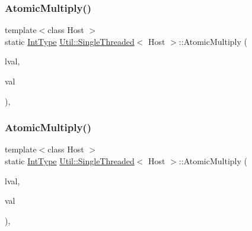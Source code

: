 \mbox{\label{classUtil_1_1SingleThreaded_a9cd0831ac28b49d1fa7bd8d24bf282bd}} 
\subsubsection{\texorpdfstring{AtomicMultiply()}{AtomicMultiply()}\hspace{0.1cm}{\footnotesize\ttfamily [1/2]}}
{\footnotesize\ttfamily template$<$class Host $>$ \\
static \mbox{\hyperlink{classUtil_1_1SingleThreaded_a35932213fb0c15a7b67ced79bc2af4c6}{Int\+Type}} \mbox{\hyperlink{classUtil_1_1SingleThreaded}{Util\+::\+Single\+Threaded}}$<$ Host $>$\+::Atomic\+Multiply (\begin{DoxyParamCaption}\item[{volatile \mbox{\hyperlink{classUtil_1_1SingleThreaded_a35932213fb0c15a7b67ced79bc2af4c6}{Int\+Type}} \&}]{lval,  }\item[{\mbox{\hyperlink{classUtil_1_1SingleThreaded_a35932213fb0c15a7b67ced79bc2af4c6}{Int\+Type}}}]{val }\end{DoxyParamCaption})\hspace{0.3cm}{\ttfamily [inline]}, {\ttfamily [static]}}

\mbox{\label{classUtil_1_1SingleThreaded_a9cd0831ac28b49d1fa7bd8d24bf282bd}} 
\subsubsection{\texorpdfstring{AtomicMultiply()}{AtomicMultiply()}\hspace{0.1cm}{\footnotesize\ttfamily [2/2]}}
{\footnotesize\ttfamily template$<$class Host $>$ \\
static \mbox{\hyperlink{classUtil_1_1SingleThreaded_a35932213fb0c15a7b67ced79bc2af4c6}{Int\+Type}} \mbox{\hyperlink{classUtil_1_1SingleThreaded}{Util\+::\+Single\+Threaded}}$<$ Host $>$\+::Atomic\+Multiply (\begin{DoxyParamCaption}\item[{volatile \mbox{\hyperlink{classUtil_1_1SingleThreaded_a35932213fb0c15a7b67ced79bc2af4c6}{Int\+Type}} \&}]{lval,  }\item[{\mbox{\hyperlink{classUtil_1_1SingleThreaded_a35932213fb0c15a7b67ced79bc2af4c6}{Int\+Type}}}]{val }\end{DoxyParamCaption})\hspace{0.3cm}{\ttfamily [inline]}, {\ttfamily [static]}}

